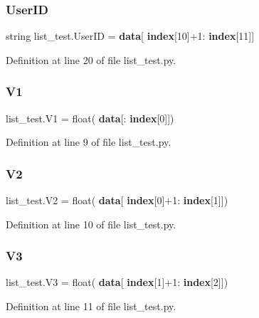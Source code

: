 \subsubsection{User\+ID}
{\footnotesize\ttfamily string list\+\_\+test.\+User\+ID = \textbf{ data}[\textbf{ index}[10]+1\+:\textbf{ index}[11]]}



Definition at line 20 of file list\+\_\+test.\+py.

\mbox{\label{namespacelist__test_a0531fe2d82635b6e9c58fe2099e3b4fd}} 
\subsubsection{V1}
{\footnotesize\ttfamily list\+\_\+test.\+V1 = float(\textbf{ data}[\+:\textbf{ index}[0]])}



Definition at line 9 of file list\+\_\+test.\+py.

\mbox{\label{namespacelist__test_a43344272bcd2e2ebfcfead8268aa92ba}} 
\subsubsection{V2}
{\footnotesize\ttfamily list\+\_\+test.\+V2 = float(\textbf{ data}[\textbf{ index}[0]+1\+:\textbf{ index}[1]])}



Definition at line 10 of file list\+\_\+test.\+py.

\mbox{\label{namespacelist__test_a4a8e8818821f00c2c79bd9125f1d6867}} 
\subsubsection{V3}
{\footnotesize\ttfamily list\+\_\+test.\+V3 = float(\textbf{ data}[\textbf{ index}[1]+1\+:\textbf{ index}[2]])}



Definition at line 11 of file list\+\_\+test.\+py.

